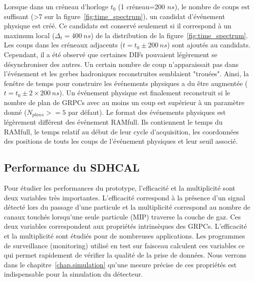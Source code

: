 Lorsque dans un créneau d'horloge $t_0$ (1 créneau=200 $ns$), le nombre de coups est suffisant (>7 sur la figure~\ref{fig:time_spectrum}), un candidat d'événement physique est créé. Ce candidats est conservé seulement si il correspond à un maximum local ($\Delta_t=400~ns$) de la distribution de la figure~\ref{fig:time_spectrum}. Les coups dans les créneaux adjacents ($t=t_0\pm200~ns$) sont ajoutés au candidats. Cependant, il a été observé que certaines DIFs pouvaient légèrement se désynchroniser des autres. Un certain nombre de coup n'apparaissait pas dans l'événement et les gerbes hadroniques reconstruites semblaient "trouées". Ainsi, la fenêtre de temps pour construire les événements physiques a du être augmentée ($t=t_0\pm 2\times200~ns$). Un événement physique est finalement reconstruit si le nombre de plan de GRPCs avec au moins un coup est supérieur à un paramètre donné ($N_{plans}>=5$ par défaut). Le format des événements physiques est légèrement différent des événement RAMfull. Ils contiennent le temps du RAMfull, le temps relatif au début de leur cycle d'acquisition, les coordonnées des positions de touts les coups de l'événement physiques et leur seuil associé.

\subsection{Performance du SDHCAL}
\label{sec.muons}
Pour étudier les performances du prototype, l'efficacité et la multiplicité sont deux variables très importantes. L'efficacité correspond à la présence d'un signal détecté lors du passage d'une particule et la multiplicité correspond au nombre de canaux touchés lorsqu'une seule particule (MIP) traverse la couche de gaz. Ces deux variables correspondent aux propriétés intrinsèques des GRPCs. L'efficacité et la multiplicité sont étudiés pour de nombreuses applications. Les programmes de surveillance (monitoring) utilisé en test sur faisceau calculent ces variables ce qui permet rapidement de vérifier la qualité de la prise de données. Nous verrons dans le chapitre~\ref{chap.simulation} qu'une mesure précise de ces propriétés est indispensable pour la simulation du détecteur.
